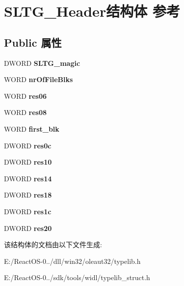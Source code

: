 \hypertarget{struct_s_l_t_g___header}{}\section{S\+L\+T\+G\+\_\+\+Header结构体 参考}
\label{struct_s_l_t_g___header}
\subsection*{Public 属性}
\begin{DoxyCompactItemize}
\item 
\mbox{\label{struct_s_l_t_g___header_a6a1c7b59c44371f48cf697dcdc67175f}} 
D\+W\+O\+RD {\bfseries S\+L\+T\+G\+\_\+magic}
\item 
\mbox{\label{struct_s_l_t_g___header_a18caa0c8287f6ca973e858c384528bb8}} 
W\+O\+RD {\bfseries nr\+Of\+File\+Blks}
\item 
\mbox{\label{struct_s_l_t_g___header_a08848a81d0209703bdc8cc504a1d8d93}} 
W\+O\+RD {\bfseries res06}
\item 
\mbox{\label{struct_s_l_t_g___header_ae0f2e0e97f12ce7927a5ad399e702ca5}} 
W\+O\+RD {\bfseries res08}
\item 
\mbox{\label{struct_s_l_t_g___header_a6329b03578071132dc06f158b2762c0c}} 
W\+O\+RD {\bfseries first\+\_\+blk}
\item 
\mbox{\label{struct_s_l_t_g___header_a8b83db9e9c7f228887a26e03f2a32a6a}} 
D\+W\+O\+RD {\bfseries res0c}
\item 
\mbox{\label{struct_s_l_t_g___header_a8716042243d5560612ffa09420497ee5}} 
D\+W\+O\+RD {\bfseries res10}
\item 
\mbox{\label{struct_s_l_t_g___header_a1c4b722b0b27377036c218531eff9151}} 
D\+W\+O\+RD {\bfseries res14}
\item 
\mbox{\label{struct_s_l_t_g___header_a53ea490ba4c6933e4be47178fd1d5b5f}} 
D\+W\+O\+RD {\bfseries res18}
\item 
\mbox{\label{struct_s_l_t_g___header_aa5518387156cd04466a12cd839907056}} 
D\+W\+O\+RD {\bfseries res1c}
\item 
\mbox{\label{struct_s_l_t_g___header_a5d4c56e7cf524f3eb8ab1a674c903c7a}} 
D\+W\+O\+RD {\bfseries res20}
\end{DoxyCompactItemize}


该结构体的文档由以下文件生成\+:\begin{DoxyCompactItemize}
\item 
E\+:/\+React\+O\+S-\/0../dll/win32/oleaut32/typelib.\+h\item 
E\+:/\+React\+O\+S-\/0../sdk/tools/widl/typelib\+\_\+struct.\+h\end{DoxyCompactItemize}
